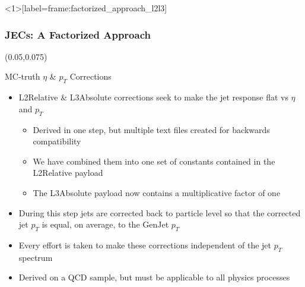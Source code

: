 \begin{frame}<1>[label=frame:factorized_approach_l2l3]
	\frametitle{JECs: A Factorized Approach}
        \begin{textblock}{.9}(0.05,0.075)
		\begin{figure}
			\label{fig:factorized_approach_l2l3}
		\end{figure}
	\end{textblock}
	\vspace*{2.3cm}
	\begin{block}{MC-truth $\eta$ \& $p_{T}$ Corrections}
		\begin{itemize}
			\footnotesize
			\item L2Relative \& L3Absolute corrections seek to make the jet response flat vs $\eta$ and $p_{T}$
			\begin{itemize}
				\item Derived in one step, but multiple text files created for backwards compatibility
				\item We have combined them into one set of constants contained in the L2Relative payload
				\item The L3Absolute payload now contains a multiplicative factor of one
			\end{itemize}
			\item During this step jets are corrected back to particle level so that the corrected jet $p_{T}$ is equal, on average, to the GenJet $p_{T}$
			\item Every effort is taken to make these corrections independent of the jet $p_{T}$ spectrum
			\item Derived on a QCD sample, but must be applicable to all physics processes
		\end{itemize}			
	\end{block}
\end{frame}
